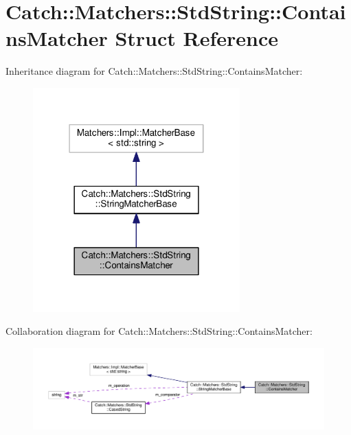 \hypertarget{structCatch_1_1Matchers_1_1StdString_1_1ContainsMatcher}{}\section{Catch\+:\+:Matchers\+:\+:Std\+String\+:\+:Contains\+Matcher Struct Reference}
\label{structCatch_1_1Matchers_1_1StdString_1_1ContainsMatcher}


Inheritance diagram for Catch\+:\+:Matchers\+:\+:Std\+String\+:\+:Contains\+Matcher\+:
\nopagebreak
\begin{figure}[H]
\begin{center}
\leavevmode
\includegraphics[width=226pt]{structCatch_1_1Matchers_1_1StdString_1_1ContainsMatcher__inherit__graph}
\end{center}
\end{figure}


Collaboration diagram for Catch\+:\+:Matchers\+:\+:Std\+String\+:\+:Contains\+Matcher\+:
\nopagebreak
\begin{figure}[H]
\begin{center}
\leavevmode
\includegraphics[width=350pt]{structCatch_1_1Matchers_1_1StdString_1_1ContainsMatcher__coll__graph}
\end{center}
\end{figure}
